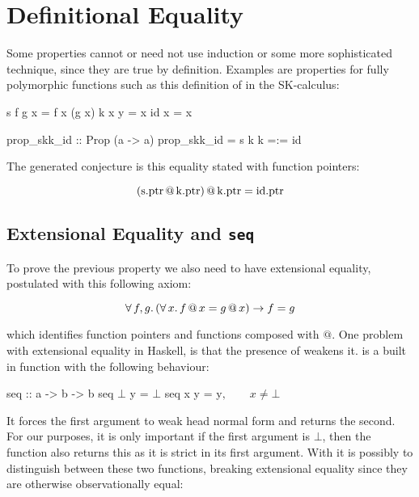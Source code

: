 \section{Definitional Equality}
\label{sec:equality}

Some properties cannot or need not use induction or some more
sophisticated technique, since they are true by definition. Examples
are properties for fully polymorphic functions such as this definition
of  in the SK-calculus:

\begin{code}
s f g x = f x (g x)
k x y = x
id x = x

prop_skk_id :: Prop (a -> a)
prop_skk_id = s k k =:= id
\end{code}

The generated conjecture is this equality stated with function pointers:

\begin{equation*}
(\mathrm{s.ptr} \, @ \, \mathrm{k.ptr} )
     \, @ \, \mathrm{k.ptr} = \mathrm{id.ptr}
\end{equation*}

\subsection{Extensional Equality and \texttt{seq}}

To prove the previous property we also need to have extensional
equality, postulated with this following axiom:

\begin{equation*}
\forall \, f , g . \, (\forall \, x . \, f \, @ \, x = g \, @ \, x) \rightarrow f = g
\end{equation*}

\noindent
which identifies function pointers and functions composed with $@$.
One problem with extensional equality in Haskell, is that the presence
of  weakens it.  is a built in function with the
following behaviour:

\begin{code}[mathescape]
seq :: a -> b -> b
seq $\bot$ y = $\bot$
seq x y = y$, \qquad x \neq \bot$
\end{code}

It forces the first argument to weak head normal form and returns the
second. For our purposes, it is only important if the first argument
is $\bot$, then the function also returns this as it is strict in its
first argument. With  it is possibly to distinguish between
these two functions, breaking extensional equality since they are
otherwise observationally equal:

